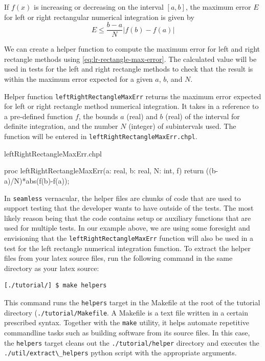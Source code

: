 If $f(x)$ is increasing or decreasing on the interval $[a,b]$, the maximum error $E$ 
for left or right rectangular numerical integration is given by
\begin{equation}
E \leq \frac{b-a}{N}\left|f(b)-f(a)\right| \label{eq:lr-rectangle-max-error}
\end{equation}

We can create a helper function to compute the maximum error for left and right rectangle
methods using \ref{eq:lr-rectangle-max-error}. The calculated value will be used
in tests for the left and right rectangle methods to check that the result is within 
the maximum error expected for a given $a$, $b$, and $N$. 
\begin{enumspec}
\item{} Helper function \lstinline{leftRightRectangleMaxErr} returns the
maximum error expected for left or right rectangle method numerical integration. It 
takes in a reference to a pre-defined function $f$, the bounds $a$ (real) and $b$ (real) of the 
interval for definite integration, and the number $N$ (integer) of subintervals used.
The function will be entered in \lstinline{leftRightRectangleMaxErr.chpl}.
\end{enumspec}

\begin{chapelhelper}{leftRightRectangleMaxErr.chpl}
\begin{chapel}
proc leftRightRectangleMaxErr(a: real, b: real, N: int, f){
  return ((b-a)/N)*abs(f(b)-f(a));
}
\end{chapel}
\end{chapelhelper}

\begin{seamlessnote}
In \lstinline{seamless} vernacular, the helper files are chunks of code that are used to support
testing that the developer wants to have outside of the tests. The most likely reason being that
the code contains setup or auxiliary functions that are used for multiple tests. In our example
above, we are using some foresight and envisioning that the \lstinline{leftRightRectangleMaxErr}
function will also be used in a test for the left rectangle numerical integration function. To 
extract the helper files from your latex source files, run the following command in the same
directory as your latex source:
\begin{verbatim}
[./tutorial/] $ make helpers
\end{verbatim}
This command runs the \lstinline{helpers} target in the Makefile at the root of the 
tutorial directory (\lstinline{./tutorial/Makefile}. A Makefile is a text 
file written in a certain prescribed syntax. Together with the \lstinline{make} utility, it 
helps automate repetitive commandline tasks such as building software from its source files. 
In this case, the \lstinline{helpers} target cleans out the \lstinline{./tutorial/helper} directory and
executes the \lstinline{./util/extract\_helpers} python script with the appropriate arguments.
\end{seamlessnote}

